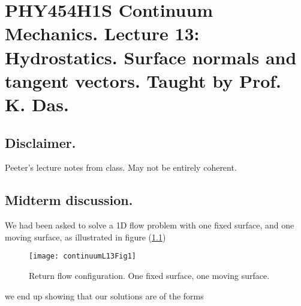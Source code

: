 
%

\chapter{PHY454H1S Continuum Mechanics.  Lecture 13: Hydrostatics.  Surface normals and tangent vectors.  Taught by Prof. K. Das.}
\label{chap:continuumL13}
{}
\date{Mar 2, 2012}

\beginArtWithToc


\section{Disclaimer.}

Peeter's lecture notes from class.  May not be entirely coherent.

\section{Midterm discussion.}

We had been asked to solve a 1D flow problem with one fixed surface, and one moving surface, as illustrated in figure (\ref{fig:continuumL13:continuumL13Fig1})
\begin{figure}[htp]
   \centering
   \texttt{[image: continuumL13Fig1]}
   \caption{Return flow configuration.  One fixed surface, one moving surface.}\label{fig:continuumL13:continuumL13Fig1}
\end{figure}

we end up showing that our solutions are of the forms

